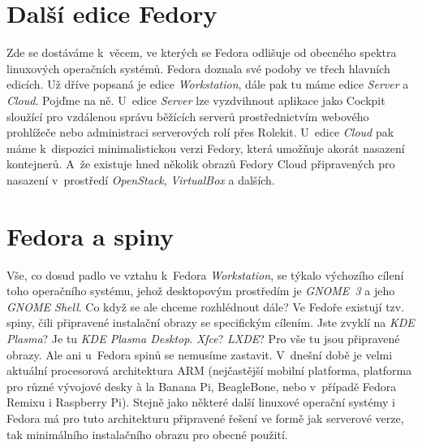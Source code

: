 \section*{Další edice Fedory}
Zde se dostáváme k~věcem, ve kterých se Fedora odlišuje od obecného spektra linuxových operačních systémů. Fedora doznala své podoby ve třech hlavních edicích. Už dříve popsaná je edice \emph{Workstation}, dále pak tu máme edice \emph{Server} a \emph{Cloud}. Pojďme na ně. U~edice \emph{Server} lze vyzdvihnout aplikace jako Cockpit sloužící pro vzdálenou správu běžících serverů prostřednictvím webového prohlížeče nebo administraci serverových rolí přes Rolekit. U~edice \emph{Cloud} pak máme k~dispozici minimalistickou verzi Fedory, která umožňuje akorát nasazení kontejnerů. A~že existuje hned několik obrazů Fedory Cloud připravených pro nasazení v~prostředí \emph{OpenStack}, \emph{VirtualBox} a dalších.

\section*{Fedora a spiny}
Vše, co dosud padlo ve vztahu k~Fedora \emph{Workstation}, se týkalo výchozího cílení toho operačního systému, jehož desktopovým prostředím je \emph{GNOME~3} a jeho \emph{GNOME Shell}. Co když se ale chceme rozhlédnout dále? Ve Fedoře existují tzv. spiny, čili připravené instalační obrazy se specifickým cílením. Jste zvyklí na \emph{KDE Plasma}? Je tu \emph{KDE Plasma Desktop}. \emph{Xfce}? \emph{LXDE}? Pro vše tu jsou připravené obrazy. Ale ani u~Fedora spinů se nemusíme zastavit. V~dnešní době je velmi aktuální procesorová architektura ARM (nejčastější mobilní platforma, platforma pro různé vývojové desky à la Banana Pi, BeagleBone, nebo v~případě Fedora Remixu i Raspberry Pi). Stejně jako některé další linuxové operační systémy i Fedora má pro tuto architekturu připravené řešení ve formě jak serverové verze, tak minimálního instalačního obrazu pro obecné použití.
